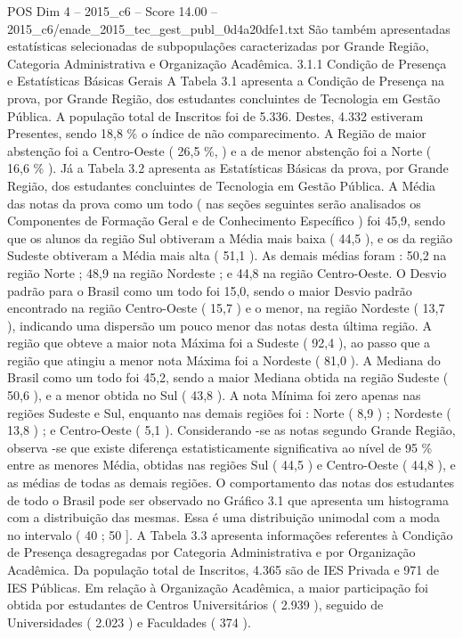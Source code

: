 \begin{textsample}{POS Dim 4 – 2015\_c6 – Score 14.00 – 2015\_c6/enade\_2015\_tec\_gest\_publ\_0d4a20dfe1.txt}
São também apresentadas estatísticas selecionadas de subpopulações caracterizadas por Grande Região, Categoria Administrativa e Organização Acadêmica. 3.1.1 Condição de Presença e Estatísticas Básicas Gerais A Tabela 3.1 apresenta a Condição de Presença na prova, por Grande Região, dos estudantes concluintes de Tecnologia em Gestão Pública.
A população total de Inscritos foi de 5.336.
Destes, 4.332 estiveram Presentes, sendo 18,8 \% o índice de não comparecimento.
A Região de maior abstenção foi a Centro-Oeste ( 26,5 \%, ) e a de menor abstenção foi a Norte ( 16,6 \% ).
Já a Tabela 3.2 apresenta as Estatísticas Básicas da prova, por Grande Região, dos estudantes concluintes de Tecnologia em Gestão Pública.
A Média das notas da prova como um todo ( nas seções seguintes serão analisados os Componentes de Formação Geral e de Conhecimento Específico ) foi 45,9, sendo que os alunos da região Sul obtiveram a Média mais baixa ( 44,5 ), e os da região Sudeste obtiveram a Média mais alta ( 51,1 ).
As demais médias foram : 50,2 na região Norte ; 48,9 na região Nordeste ; e 44,8 na região Centro-Oeste.
O Desvio padrão para o Brasil como um todo foi 15,0, sendo o maior Desvio padrão encontrado na região Centro-Oeste ( 15,7 ) e o menor, na região Nordeste ( 13,7 ), indicando uma dispersão um pouco menor das notas desta última região.
A região que obteve a maior nota Máxima foi a Sudeste ( 92,4 ), ao passo que a região que atingiu a menor nota Máxima foi a Nordeste ( 81,0 ).
A Mediana do Brasil como um todo foi 45,2, sendo a maior Mediana obtida na região Sudeste ( 50,6 ), e a menor obtida no Sul ( 43,8 ).
A nota Mínima foi zero apenas nas regiões Sudeste e Sul, enquanto nas demais regiões foi : Norte ( 8,9 ) ; Nordeste ( 13,8 ) ; e Centro-Oeste ( 5,1 ).
Considerando -se as notas segundo Grande Região, observa -se que existe diferença estatisticamente significativa ao nível de 95 \% entre as menores Média, obtidas nas regiões Sul ( 44,5 ) e Centro-Oeste ( 44,8 ), e as médias de todas as demais regiões.
O comportamento das notas dos estudantes de todo o Brasil pode ser observado no Gráfico 3.1 que apresenta um histograma com a distribuição das mesmas.
Essa é uma distribuição unimodal com a moda no intervalo ( 40 ; 50 ].
A Tabela 3.3 apresenta informações referentes à Condição de Presença desagregadas por Categoria Administrativa e por Organização Acadêmica.
Da população total de Inscritos, 4.365 são de IES Privada e 971 de IES Públicas.
Em relação à Organização Acadêmica, a maior participação foi obtida por estudantes de Centros Universitários ( 2.939 ), seguido de Universidades ( 2.023 ) e Faculdades ( 374 ).

\end{textsample}
